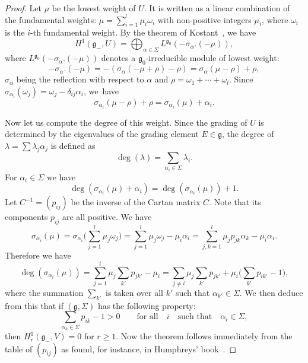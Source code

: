 \documentclass[10pt,a4paper]{amsart}
\newcommand{\g}{\mathfrak g}
\numberwithin{equation}{section}
\begin{document}
\begin{proof}
	Let $\mu$ be the lowest weight of $U$.	It is written as a linear combination of the fundamental weights: $\mu = \sum_{i=1}^l \mu_i\omega_i$ with non-positive integers $\mu_i$, where $\omega_i$ is the $i$-th fundamental weight.
	By the theorem of Kostant~\cite{kost}, we have
	\[
	H^1(\g_- , U) = \bigoplus _{\alpha \in \Sigma}L^{\g_0}(-\sigma_{\alpha}.(-\mu)),
	\]
	where $L^{\g_0}(-\sigma_{\alpha}.(-\mu))$ denotes a $\g_0$-irreducible module of lowest weight:
	\[
	-\sigma_{\alpha}.(-\mu) = -(\sigma_{\alpha}(-\mu + \rho ) -\rho)
	= \sigma_{\alpha}(\mu - \rho ) +\rho,
	\]
	$\sigma_{\alpha}$ being the reflection with respect to $\alpha $ and
	$\rho = \omega_1 + \cdots + \omega_l $.
	Since $\sigma_{\alpha_i}(\omega_j) = \omega_j - \delta_{ij}\alpha_i$,
	we~have
	\[
	\sigma_{\alpha_i}(\mu - \rho ) +\rho = \sigma_{\alpha_i}(\mu ) +\alpha_i.
	\]
	
	Now let us compute the degree of this weight. Since the grading of $U$ is determined by the eigenvalues of the grading element $E\in\g$, the degree of $\lambda = \sum \lambda_j \alpha_j$ is defined as
	\[
	\deg(\lambda) = \sum _{\alpha_i \in \Sigma}\lambda_i.
	\]
	For $\alpha_i \in \Sigma$ we have
	\[
	\deg(\sigma_{\alpha_i}(\mu ) +\alpha_i) = \deg(\sigma_{\alpha_i}(\mu )) + 1 .
	\]
	Let $C^{-1}=(p_{ij})$ be the inverse of the Cartan matrix $C$. Note that its components $p_{ij}$ are all positive. We have
	\[
	\sigma_{\alpha_i}(\mu ) = \sigma_{\alpha_i}\bigg(\sum_{j=1}^l \mu_j \omega_j \bigg) = \sum_{j=1}^l \mu_j \omega_j - \mu_i\alpha_i
	= \sum_{j,k=1}^l \mu_j p_{jk} \alpha_k - \mu_i\alpha_i.
	\]
	Therefore we have
	\[
		\deg (\sigma_{\alpha_i}(\mu )) = \sum _{j=1}^l\mu_j\sum_{k'} p_{jk'} - \mu_i = \sum _{j\neq i}\mu_j \sum_{k'}p_{jk'} + \mu_i\bigg(\sum_{k'} p_{ik'}-1\bigg),
	\]
	where the summation $\sum_{k'}$ is taken over all $k'$ such that $\alpha_{k'} \in \Sigma$.
	We then deduce from this that if $(\g, \Sigma)$ has the following property:
	\[
	\sum _{\alpha_{k} \in \Sigma} p_{ik}-1 > 0 \qquad \text {for all}\quad i\quad
	\text{such that}\quad \alpha _i \in \Sigma,
	\]
	then
	$H^1_r(\g_-, V) = 0 $ for $r \ge 1$.
	Now the theorem follows immediately from the table of $(p_{ij})$
	as found, for instance, in Humphreys' book~\cite[p.~69]{humph}.
\end{proof}
\end{document}
